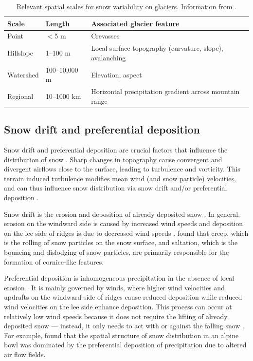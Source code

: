 \documentclass{sfuthesis}
\begin{document}
\begin{table}[]
\centering
\caption{Relevant spatial scales for snow variability on glaciers. Information from \cite{Clark2011}.}
\label{scale}
\begin{tabular}{lll}
\textbf{Scale} & \textbf{Length} & \textbf{Associated glacier feature}                     \\ \hline
Point          & $<$5 m         & Crevasses                                               \\
Hillslope      & 1--100 m        & Local surface topography (curvature, slope), avalanching        \\
Watershed      & 100--10,000 m   & Elevation, aspect                                       \\
Regional       & 10--1000 km     & Horizontal precipitation gradient across mountain range
\end{tabular}
\end{table}

\subsection{Snow drift and preferential deposition}
Snow drift and preferential deposition are crucial factors that influence the distribution of snow \citep{Lehning2008, Winstral2002, Clark2011}. Sharp changes in topography cause convergent and divergent airflows close to the surface, leading to turbulence and vorticity. This terrain induced turbulence modifies mean wind (and snow particle) velocities, and can thus influence snow distribution via snow drift and/or preferential deposition \citep{Mott2008, Lehning2008, Dadic2010}.

Snow drift is the erosion and deposition of already deposited snow \citep{Dadic2010}. In general, erosion on the windward side is caused by increased wind speeds and deposition on the lee side of ridges is due to decreased wind speeds \citep{Liston1998, Mott2008, Dadic2010}. \cite{Mott2010} found that creep, which is the rolling of snow particles on the snow surface, and saltation, which is the bouncing and dislodging of snow particles, are primarily responsible for the formation of cornice-like features. 

Preferential deposition is inhomogeneous precipitation in the absence of local erosion \citep{Lehning2008}. It is mainly governed by winds, where higher wind velocities and updrafts on the windward side of ridges cause reduced deposition while reduced wind velocities on the lee side enhance deposition. This process can occur at relatively low wind speeds because it does not require the lifting of already deposited snow  --- instead, it only needs to act with or against the falling snow \citep{Mott2008, Dadic2010}. For example, \cite{Mott2011} found that the spatial structure of snow distribution in an alpine bowl was dominated by the preferential deposition of precipitation due to altered air flow fields. 
\end{document}
